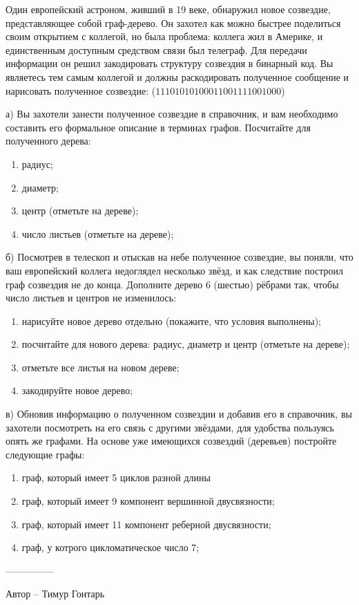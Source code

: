 \question
Один европейский астроном, живший в 19 веке, обнаружил новое созвездие, представляющее собой граф-дерево. Он захотел как можно быстрее поделиться своим открытием с коллегой, но была проблема: коллега жил в Америке, и единственным доступным средством связи был телеграф. Для передачи информации он решил закодировать структуру созвездия в бинарный код. Вы являетесь тем самым коллегой и должны раскодировать полученное сообщение и нарисовать полученное созвездие: ($11101010100011001111001000$)

а) Вы захотели занести полученное созвездие в справочник, и вам необходимо составить его формальное описание в терминах графов. Посчитайте для полученного дерева:
\begin{enumerate}
\item радиус;
\item диаметр;
\item центр (отметьте на дереве);
\item число листьев (отметьте на дереве);
\end{enumerate}

б) Посмотрев в телескоп и отыскав на небе полученное созвездие, вы поняли, что ваш европейский коллега недоглядел несколько звёзд, и как следствие построил граф созвездия не до конца. Дополните дерево 6 (шестью) рёбрами так, чтобы число листьев и центров не изменилось:
\begin{enumerate}
\item нарисуйте новое дерево отдельно (покажите, что условия выполнены);
\item посчитайте для нового дерева: радиус, диаметр и центр (отметьте на дереве);
\item отметьте все листья на новом дереве;
\item закодируйте новое дерево;
\end{enumerate}

в) Обновив информацию о полученном созвездии и добавив его в справочник, вы захотели посмотреть на его связь с другими звёздами, для удобства пользуясь опять же графами. На основе уже имеющихся созвездий (деревьев) постройте следующие графы:
\begin{enumerate}
\item граф, который имеет 5 циклов разной длины
\item граф, который имеет 9 компонент вершинной двусвязности;
\item граф, который имеет 11 компонент реберной двусвязности;
\item граф, у котрого цикломатическое число 7;
\end{enumerate}

---------------

Автор -- Тимур Гонтарь
